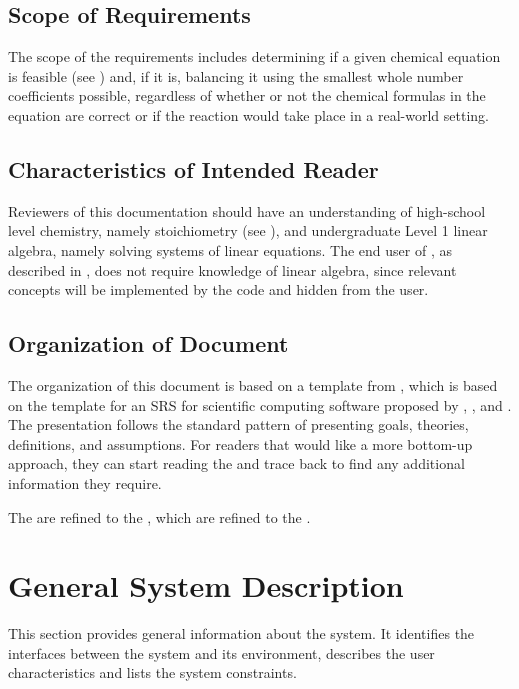 \documentclass[12pt]{article}
\begin{document}
\subsection{Scope of Requirements} \label{sec_scope}

The scope of the requirements includes determining if a given chemical equation
is feasible (see ) and, if it is, balancing it using the
smallest whole number coefficients possible, regardless of whether or not the
chemical formulas in the equation are correct or if the reaction would take
place in a real-world setting.

\subsection{Characteristics of Intended Reader} \label{sec_IntendedReader}
Reviewers of this documentation should have an understanding of high-school level
chemistry, namely stoichiometry (see ), and undergraduate
Level 1 linear algebra, namely solving systems of linear equations. The end user
of \progname{}, as described in , does not require
knowledge of linear algebra, since relevant concepts will be implemented by the
code and hidden from the user.

\subsection{Organization of Document}
The organization of this document is based on a template from
\cite{smith_captemplate_2022}, which is based on the template for an SRS for
scientific computing software proposed by \cite{SmithAndLai2005},
\cite{SmithEtAl2007}, and \cite{koothoor_document_2013}. The presentation
follows the standard pattern of presenting goals, theories, definitions, and
assumptions. For readers that would like a more bottom-up approach, they can
start reading the  and trace back to find any additional
information they require.

The  are refined to the , which are
refined to the .

\section{General System Description}

This section provides general information about the system.  It identifies the
interfaces between the system and its environment, describes the user
characteristics and lists the system constraints.  
\end{document}
